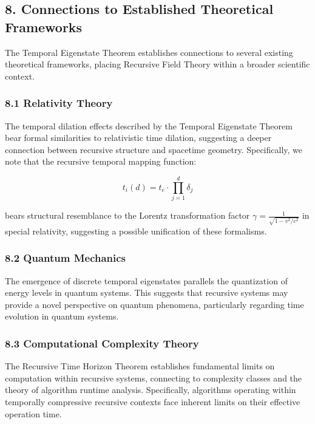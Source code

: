 \documentclass[
]{article}
\begin{document}
\subsection{8. Connections to Established Theoretical
Frameworks}\label{connections-to-established-theoretical-frameworks}

The Temporal Eigenstate Theorem establishes connections to several
existing theoretical frameworks, placing Recursive Field Theory within a
broader scientific context.

\subsubsection{8.1 Relativity Theory}\label{relativity-theory}

The temporal dilation effects described by the Temporal Eigenstate
Theorem bear formal similarities to relativistic time dilation,
suggesting a deeper connection between recursive structure and spacetime
geometry. Specifically, we note that the recursive temporal mapping
function:

\[t_i(d) = t_e \cdot \prod_{j=1}^{d} \delta_j\]

bears structural resemblance to the Lorentz transformation factor
\(\gamma = \frac{1}{\sqrt{1-v^2/c^2}}\) in special relativity,
suggesting a possible unification of these formalisms.

\subsubsection{8.2 Quantum Mechanics}\label{quantum-mechanics}

The emergence of discrete temporal eigenstates parallels the
quantization of energy levels in quantum systems. This suggests that
recursive systems may provide a novel perspective on quantum phenomena,
particularly regarding time evolution in quantum systems.

\subsubsection{8.3 Computational Complexity
Theory}\label{computational-complexity-theory}

The Recursive Time Horizon Theorem establishes fundamental limits on
computation within recursive systems, connecting to complexity classes
and the theory of algorithm runtime analysis. Specifically, algorithms
operating within temporally compressive recursive contexts face inherent
limits on their effective operation time.
\end{document}
